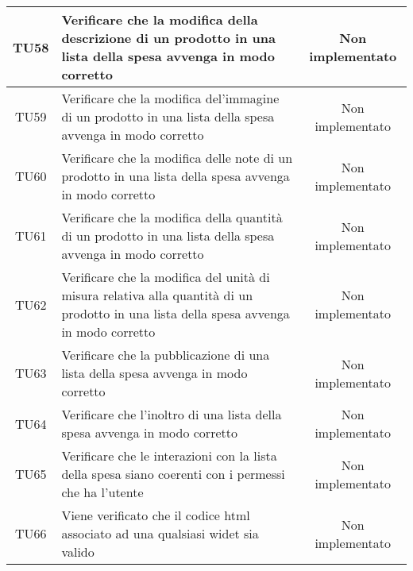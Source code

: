\begin{center}
\begin{longtable}{|c|>{\centering}m{7cm}|c|}
		TU58 & Verificare che la modifica della descrizione di un prodotto in una lista della spesa avvenga in modo corretto & Non implementato \\ \hline
		TU59 & Verificare che la modifica del'immagine di un prodotto in una lista della spesa avvenga in modo corretto & Non implementato \\ \hline
		TU60 & Verificare che la modifica delle note di un prodotto in una lista della spesa avvenga in modo corretto & Non implementato \\ \hline
		TU61 & Verificare che la modifica della quantità di un prodotto in una lista della spesa avvenga in modo corretto & Non implementato \\ \hline
		TU62 & Verificare che la modifica del unità di misura relativa alla quantità di un prodotto in una lista della spesa avvenga in modo corretto & Non implementato \\ \hline
		TU63 & Verificare che la pubblicazione di una lista della spesa avvenga in modo corretto & Non implementato \\ \hline
		TU64 & Verificare che l'inoltro di una lista della spesa avvenga in modo corretto & Non implementato \\ \hline
		TU65 & Verificare che le interazioni con la lista della spesa siano coerenti con i permessi che ha l'utente & Non implementato \\ \hline
		TU66 & Viene verificato che il codice html associato ad una qualsiasi widet sia valido & Non implementato \\ \hline
	\end{longtable}
\end{center}
